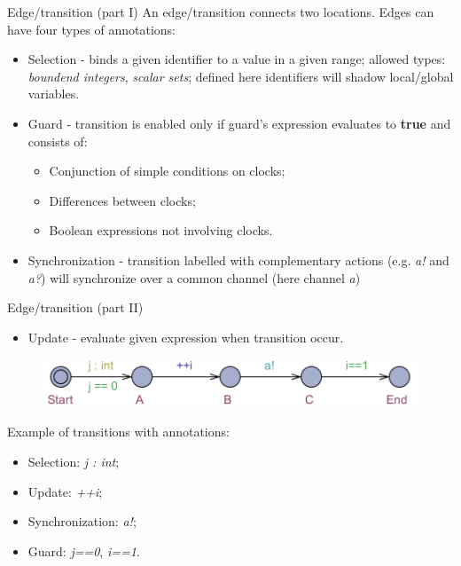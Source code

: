 \documentclass{beamer}
\begin{document}
\begin{frame}{Edge/transition (part I)}
	An edge/transition connects two locations. Edges can have four types of annotations:
	
	\begin{itemize}
		\item Selection - binds a given identifier to a value in a given range; allowed types: \textit{boundend integers}, \textit{scalar sets}; defined here identifiers will shadow local/global variables.
		\item Guard - transition is enabled only if guard's expression evaluates to \textbf{true} and consists of:
		\begin{itemize}
			\item Conjunction of simple conditions on clocks;
			\item Differences between clocks;
			\item Boolean expressions not involving clocks.
		\end{itemize}
		\item Synchronization - transition labelled with complementary actions (e.g. \textit{a!} and \textit{a?}) will synchronize over a common channel (here channel \textit{a})
	\end{itemize}
	
\end{frame}

\begin{frame}{Edge/transition (part II)}
	\begin{itemize}
		\item Update - evaluate given expression when transition occur.
	\end{itemize}	
	
	\begin{figure}[H]
		\includegraphics[scale=0.8]{img/uppaal_transitions.png}
	\end{figure}
	Example of transitions with annotations:
	\begin{itemize}
		\item Selection: \textit{j : int};
		\item Update: \textit{++i};
		\item Synchronization: \textit{a!};
		\item Guard: \textit{j==0}, \textit{i==1}.
	\end{itemize}
\end{frame}
\end{document}
